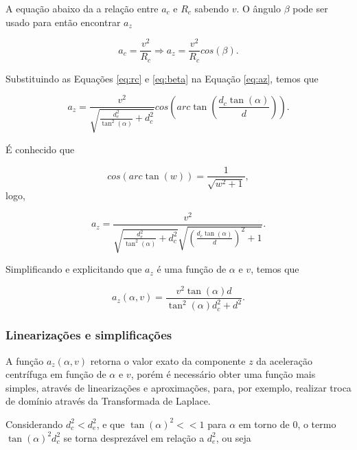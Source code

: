         A equação abaixo da a relação entre $a_c$ e $R_c$ sabendo $v$. O ângulo $\beta$ pode ser usado para então encontrar $a_z$
        
        \begin{equation}
            a_c = \frac{v^2}{R_c} \Rightarrow a_z = \frac{v^2}{R_c}cos(\beta).
            \label{eq:az}
        \end{equation}
        
        Substituindo as Equações \eqref{eq:rc} e \eqref{eq:beta} na Equação \eqref{eq:az}, temos que
        
        \begin{equation}
            a_z = \frac{v^2}{\sqrt{\frac{d_e^2}{\tan^2(\alpha)} + d_c^2}}cos(arc\tan(\frac{d_c \tan(\alpha)}{d})).
        \end{equation}
        
        É conhecido que
        
        \begin{equation}
            cos(arc\tan (w)) = \frac{1}{\sqrt{w^2+1}},
        \end{equation}
        logo,
        
        \begin{equation}
            a_z = \frac{v^2}{\sqrt{\frac{d_e^2}{\tan^2(\alpha)} + d_c^2}   \sqrt{(\frac{d_c \tan(\alpha)}{d})^2+1}}.
        \end{equation}
        
        Simplificando e explicitando que $a_z$ é uma função de $\alpha$ e $v$, temos que
        
        \begin{equation}
            a_z(\alpha, v) = \frac{v^2\tan(\alpha)d}{\tan^2(\alpha)d_c^2+d^2}.
        \end{equation}
        
        \subsubsection{Linearizações e simplificações}
    
        A função $a_z(\alpha,v)$ retorna o valor exato da componente $z$ da aceleração centrífuga em função de $\alpha$ e $v$, porém é necessário obter uma função mais simples, através de linearizações e aproximações, para, por exemplo, realizar troca de domínio através da Transformada de Laplace.
        
        Considerando $d_c^2 < d_e^2$, e que $\tan(\alpha)^2 << 1$ para $\alpha$ em torno de $0$, o termo $\tan(\alpha)^2d_c^2$ se torna desprezável em relação a $d_e^2$, ou seja
        
